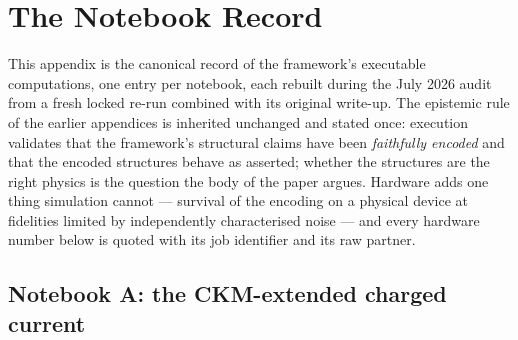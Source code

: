 %
%

\section{The Notebook Record}
\label{app:notebook-record}

This appendix is the canonical record of the framework's executable computations, one entry per
notebook, each rebuilt during the July 2026 audit from a fresh locked re-run combined with its
original write-up. The epistemic rule of the earlier appendices is inherited unchanged and stated
once: execution validates that the framework's structural claims have been \emph{faithfully
encoded} and that the encoded structures behave as asserted; whether the structures are the right
physics is the question the body of the paper argues. Hardware adds one thing simulation cannot
--- survival of the encoding on a physical device at fidelities limited by independently
characterised noise --- and every hardware number below is quoted with its job identifier and its
raw partner.


\subsection{Notebook A: the CKM-extended charged current}
\label{app:nb-A}

